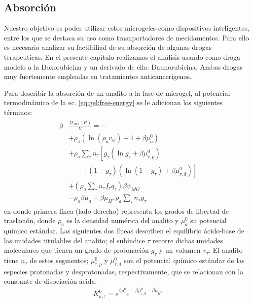 \subsection{Absorci\'on}\label{sec:gel:adsorcion}

Nuestro objetivo es poder utilizar estos microgeles como dispositivos inteligentes, entre los que se destaca su uso como trasnportadores de mecidamentos. Para ello es necesario analizar su factibiliad de su absorci\'on de algunas drogas terapeuticas. En el presente cap\'itulo realizamos el an\'alisis usando como droga modelo a la Doxorubicina y un derivado de ella: Daunorubicina. Ambas drogas muy fuertemente empleadas en tratamientos anticancerigenos. 

Para describir la absorci\'on de un analito a la fase de microgel,
al potencial termodin\'amico de la ec. \ref{eq:gel:free-energy} se le adicionan los siguientes t\'erminos:
%
%
%
\begin{align}
\begin{aligned}
\beta&\frac{\Omega_{MG}(R)}{V}= \cdots\\&+ \rho_a\left(\ln\left(\rho_a v_w\right) -1 + \beta\mu^0_a\right) \\
& + \rho_a \sum_\tau n_\tau  \left[g_\tau(\ln g_\tau+ \beta\mu^0_{\tau,p})\right.\\
&\qquad\left.+(1-g_\tau)(\ln (1-g_\tau)+\beta\mu^0_{\tau, d})\right] \\
& +  \left( \rho_a \sum_\tau n_\tau f_\tau q_\tau\right)\beta\psi_{MG}\\
& -\rho_a\beta\mu_a
 -\beta\mu_{H^+} \rho_a \sum_\tau n_\tau g_\tau
\end{aligned}
\label{eq:gel:ads}
\end{align}
%
\noindent en donde primera l\'inea (lado derecho) representa los grados de libertad de traslaci\'on,
donde $\rho_a$ es la densidad num\'erica del analito y $\mu_a^0$ su potencial qu\'imico est\'andar.
Las siguientes dos l\'ineas describen el equilibrio \'acido-base de las unidades titulables del analito;
el sub\'indice $\tau$ recorre dichas unidades moleculares que tienen un grado de protonaci\'on $g_\tau$ y un volumen $v_\tau$.
El analito tiene $n_\tau$ de estos segmentos;
$\mu^0_{\tau, p}$ y $\mu^0_{\tau,d}$ son el potencial qu\'imico est\'andar de las especies protonadas y desprotonadas, respectivamente, que se relacionan con la constante de disociaci\'on \'acida:
%
\begin{align}
K^0_{a,\tau}= e^{\beta\mu^0_{\tau, p}-\beta\mu^0_{\tau,d}-\beta\mu^0_{H^+}}
\end{align}
%

